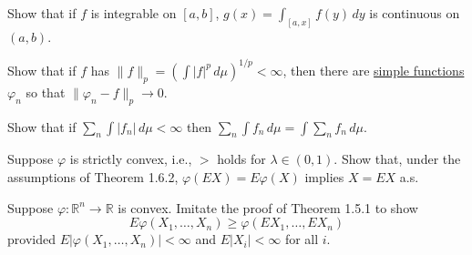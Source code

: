   \begin{exercise}[Durrett 1.5.8]
    Show that if $f$ is integrable on $[a, b]$, $g(x) = \int_{[a, x]} f(y) \, dy$ is continuous on $(a, b)$.
  \end{exercise}
  \begin{solution}

  \end{solution}

  \begin{exercise}[Durrett 1.5.9]
    Show that if $f$ has $\|f\|_p = (\int |f|^p \, d\mu)^{1/p} < \infty$, then there are \hyperref[mt-def:simple-functions]{simple functions} $\varphi_n$ so that $\|\varphi_n - f\|_p \to 0$.
  \end{exercise}
  \begin{solution}

  \end{solution}

  \begin{exercise}[Durrett 1.5.10]
    Show that if $\sum_n \int |f_n| \, d\mu < \infty$ then $\sum_n \int f_n \, d\mu = \int \sum_n f_n \, d\mu$.
  \end{exercise}
  \begin{solution}

  \end{solution}

  \begin{exercise}[Durrett 1.6.1]
    Suppose $\varphi$ is strictly convex, i.e., $>$ holds for $\lambda \in (0, 1)$. Show that, under the assumptions of Theorem 1.6.2, $\varphi(EX) = E\varphi(X)$ implies $X = EX$ a.s.
  \end{exercise}
  \begin{solution}

  \end{solution}

  \begin{exercise}[Durrett 1.6.2]
    Suppose $\varphi : \mathbb{R}^n \to \mathbb{R}$ is convex. Imitate the proof of Theorem 1.5.1 to show
    \begin{equation*}
      E\varphi(X_1, \dots, X_n) \geq \varphi(EX_1, \dots, EX_n)
    \end{equation*}
    provided $E|\varphi(X_1, \dots, X_n)| < \infty$ and $E|X_i| < \infty$ for all $i$.
  \end{exercise}
  \begin{solution}

  \end{solution}

